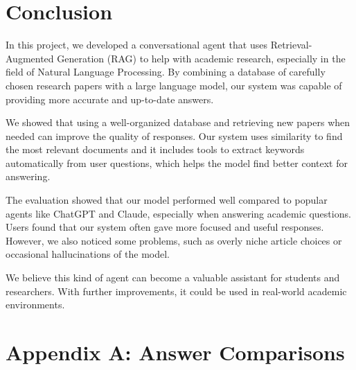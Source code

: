 \documentclass[fleqn,moreauthors,10pt]{ds_report}
\begin{document}

\section*{Conclusion}
In this project, we developed a conversational agent that uses Retrieval-Augmented Generation (RAG) to help with academic research, especially in the field of Natural Language Processing. By combining a database of carefully chosen research papers with a large language model, our system was capable of providing more accurate and up-to-date answers.

We showed that using a well-organized database and retrieving new papers when needed can improve the quality of responses. Our system uses similarity to find the most relevant documents and it includes tools to extract keywords automatically from user questions, which helps the model find better context for answering.

The evaluation showed that our model performed well compared to popular agents like ChatGPT and Claude, especially when answering academic questions. Users found that our system often gave more focused and useful responses. However, we also noticed some problems, such as overly niche article
choices or occasional hallucinations of the model.

We believe this kind of agent can become a valuable assistant for students and researchers. With further improvements, it could be used in real-world academic environments.







\clearpage


\appendix
\appendix
\section*{Appendix A: Answer Comparisons}
\label{appendix:a}
\end{document}
